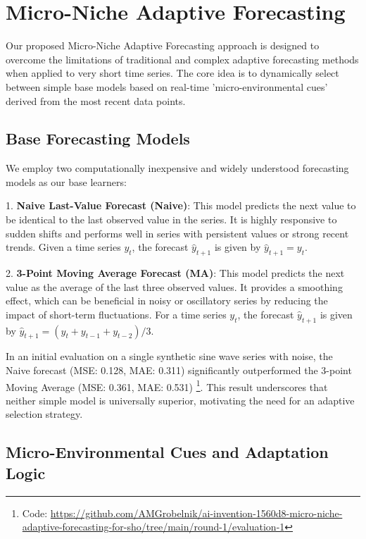 \documentclass[11pt,letterpaper]{article}
\begin{document}
\section{Micro-Niche Adaptive Forecasting}

Our proposed Micro-Niche Adaptive Forecasting approach is designed to overcome the limitations of traditional and complex adaptive forecasting methods when applied to very short time series. The core idea is to dynamically select between simple base models based on real-time 'micro-environmental cues' derived from the most recent data points.

\subsection{Base Forecasting Models}

We employ two computationally inexpensive and widely understood forecasting models as our base learners:

1.  \textbf{Naive Last-Value Forecast (Naive)}: This model predicts the next value to be identical to the last observed value in the series. It is highly responsive to sudden shifts and performs well in series with persistent values or strong recent trends. Given a time series $y_t$, the forecast $\hat{y}_{t+1}$ is given by $\hat{y}_{t+1} = y_t$.

2.  \textbf{3-Point Moving Average Forecast (MA)}: This model predicts the next value as the average of the last three observed values. It provides a smoothing effect, which can be beneficial in noisy or oscillatory series by reducing the impact of short-term fluctuations. For a time series $y_t$, the forecast $\hat{y}_{t+1}$ is given by $\hat{y}_{t+1} = (y_t + y_{t-1} + y_{t-2}) / 3$.

In an initial evaluation on a single synthetic sine wave series with noise, the Naive forecast (MSE: 0.128, MAE: 0.311) significantly outperformed the 3-point Moving Average (MSE: 0.361, MAE: 0.531) \footnote{Code: \url{https://github.com/AMGrobelnik/ai-invention-1560d8-micro-niche-adaptive-forecasting-for-sho/tree/main/round-1/evaluation-1}}. This result underscores that neither simple model is universally superior, motivating the need for an adaptive selection strategy.

\subsection{Micro-Environmental Cues and Adaptation Logic}
\end{document}
